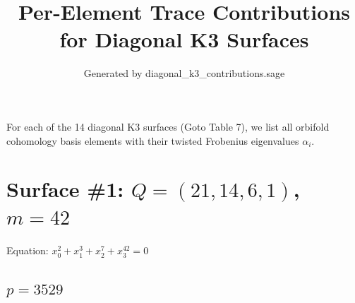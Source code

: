 \documentclass[11pt]{article}
\begin{document}
\title{Per-Element Trace Contributions for Diagonal K3 Surfaces}
\author{Generated by diagonal\_k3\_contributions.sage}
\maketitle

For each of the 14 diagonal K3 surfaces (Goto Table 7), we list all orbifold
cohomology basis elements with their twisted Frobenius eigenvalues $\alpha_i$.


\section*{Surface \#1: $Q=(21, 14, 6, 1)$, $m=42$}

Equation: $x_0^{2} + x_1^{3} + x_2^{7} + x_3^{42} = 0$

\subsection*{$p = 3529$}
\end{document}
